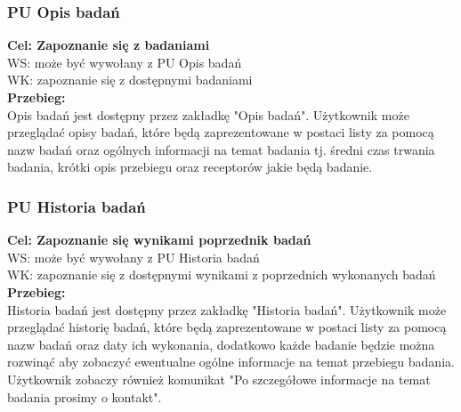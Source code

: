\documentclass[12pt, letterpaper]{article}
\begin{document}
		\subsubsection{PU Opis badań}
		
		\quad
		
		\textbf{Cel: Zapoznanie się z badaniami}\\
		
		WS: może być wywołany z PU Opis badań\\
		
		WK: zapoznanie się z dostępnymi badaniami\\
		
		\textbf{Przebieg:}\\
		Opis badań jest dostępny przez zakładkę "Opis badań". Użytkownik może przeglądać opisy badań, które będą zaprezentowane w postaci listy za pomocą nazw badań oraz ogólnych informacji na temat badania tj. średni czas trwania badania, krótki opis przebiegu oraz receptorów jakie będą badanie. \\
		
		
		\subsubsection{PU Historia badań}
		
		\quad
		
		\textbf{Cel: Zapoznanie się wynikami poprzednik badań}\\
		
		WS: może być wywołany z PU Historia badań\\
		
		WK: zapoznanie się z dostępnymi wynikami z poprzednich wykonanych badań\\
		
		\textbf{Przebieg:}\\
		Historia badań jest dostępny przez zakładkę "Historia badań". Użytkownik może przeglądać historię badań, które będą zaprezentowane w postaci listy za pomocą nazw badań oraz daty ich wykonania, dodatkowo każde badanie będzie można rozwinąć aby zobaczyć ewentualne ogólne informacje na temat przebiegu badania. Użytkownik zobaczy również komunikat "Po szczegółowe informacje na temat badania prosimy o kontakt". \\
		
		
\end{document}
